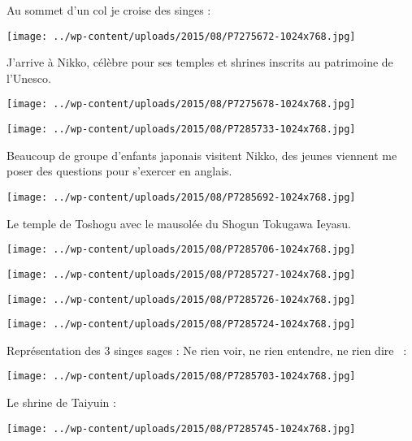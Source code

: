 \pagebreak
 Au sommet d'un col je croise des singes :
\begin{center} \texttt{[image: ../wp-content/uploads/2015/08/P7275672-1024x768.jpg]} \end{center}

 J'arrive à Nikko, célèbre pour ses temples et shrines inscrits au patrimoine de l'Unesco. 
\begin{center} \texttt{[image: ../wp-content/uploads/2015/08/P7275678-1024x768.jpg]} \end{center}
\begin{center} \texttt{[image: ../wp-content/uploads/2015/08/P7285733-1024x768.jpg]} \end{center}

  Beaucoup de groupe d'enfants japonais visitent Nikko, des jeunes viennent me poser des questions pour s'exercer en anglais. 
\begin{center} \texttt{[image: ../wp-content/uploads/2015/08/P7285692-1024x768.jpg]} \end{center}

\pagebreak
 Le temple de Toshogu avec le mausolée du Shogun Tokugawa Ieyasu. 
\begin{center} \texttt{[image: ../wp-content/uploads/2015/08/P7285706-1024x768.jpg]} \end{center}
\begin{center} \texttt{[image: ../wp-content/uploads/2015/08/P7285727-1024x768.jpg]} \end{center}
\begin{center} \texttt{[image: ../wp-content/uploads/2015/08/P7285726-1024x768.jpg]} \end{center}
\begin{center} \texttt{[image: ../wp-content/uploads/2015/08/P7285724-1024x768.jpg]} \end{center}

\pagebreak
 Représentation des 3 singes sages : \og Ne rien voir, ne rien entendre, ne rien dire \fg\ :
\begin{center} \texttt{[image: ../wp-content/uploads/2015/08/P7285703-1024x768.jpg]} \end{center}

 Le shrine de Taiyuin :
\begin{center} \texttt{[image: ../wp-content/uploads/2015/08/P7285745-1024x768.jpg]} \end{center}

